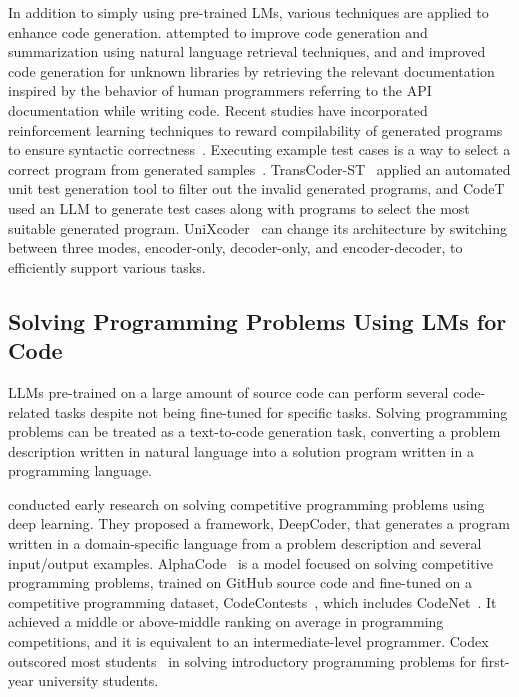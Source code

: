 \documentclass{article}
\begin{document}
In addition to simply using pre-trained LMs, various techniques are applied to enhance code generation.
\citet{parvez2021retrieval} attempted to improve code generation and summarization using natural language retrieval techniques, and \citet{washio2022docs} and \citet{zhou2023docprompting} improved code generation for unknown libraries by retrieving the relevant documentation inspired by the behavior of human programmers referring to the API documentation while writing code.
Recent studies have incorporated reinforcement learning techniques to reward compilability of generated programs to ensure syntactic correctness~\citep{le2022coderl, wang2022compilable}.
Executing example test cases is a way to select a correct program from generated samples~\citep{li2022alphacode, shi2022execution}. TransCoder-ST~\citep{roziere2022transcoder-st} applied an automated unit test generation tool to filter out the invalid generated programs, and CodeT~\citep{chen2022codet} used an LLM to generate test cases along with programs to select the most suitable generated program.
UniXcoder~\citep{guo2022unixcoder} can change its architecture by switching between three modes, encoder-only, decoder-only, and encoder-decoder, to efficiently support various tasks.





\subsection{Solving Programming Problems Using LMs for Code}

LLMs pre-trained on a large amount of source code can perform several code-related tasks despite not being fine-tuned for specific tasks.
Solving programming problems can be treated as a text-to-code generation task, converting a problem description written in natural language into a solution program written in a programming language.

\citet{balog2017deepcoder} conducted early research on solving competitive programming problems using deep learning.
They proposed a framework, DeepCoder, that generates a program written in a domain-specific language from a problem description and several input/output examples.
AlphaCode~\citep{li2022alphacode} is a model focused on solving competitive programming problems, trained on GitHub source code and fine-tuned on a competitive programming dataset, CodeContests~\citep{li2022alphacode}, which includes CodeNet~\citep{ruchir2021codenet}.
It achieved a middle or above-middle ranking on average in programming competitions, and it is equivalent to an intermediate-level programmer.
Codex outscored most students~\citep{finnie2022robots} in solving introductory programming problems for first-year university students.
\end{document}
